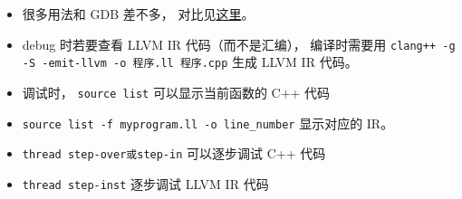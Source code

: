
\begin{issues}
\issueDraft
\end{issues}


\begin{itemize}
\item 很多用法和 GDB 差不多， 对比见\href{https://lldb.llvm.org/use/map.html}{这里}。
\item debug 时若要查看 LLVM IR 代码（而不是汇编）， 编译时需要用 \verb|clang++ -g -S -emit-llvm -o 程序.ll 程序.cpp| 生成 LLVM IR 代码。
\item 调试时， \verb|source list| 可以显示当前函数的 C++ 代码
\item \verb|source list -f myprogram.ll -o line_number| 显示对应的 IR。
\item \verb|thread step-over或step-in| 可以逐步调试 C++ 代码
\item \verb|thread step-inst| 逐步调试 LLVM IR 代码
\end{itemize}
